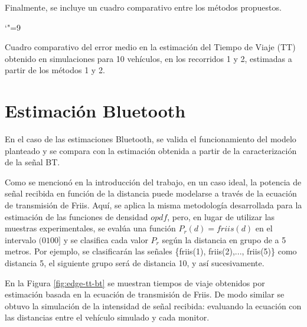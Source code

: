 Finalmente, se incluye un cuadro comparativo entre los métodos propuestos.

\begin{table}[!htp]
\centering
\begingroup\catcode`"=9
 \captionsetup{width=0.8\textwidth}
    \caption{Cuadro comparativo del error medio en la estimación del Tiempo de Viaje (TT) obtenido en simulaciones para 10 vehículos, en los recorridos 1 y 2, estimadas a partir de los métodos 1 y 2.}
    \label{tbl:method-compare}
\endgroup
\end{table}


\section{Estimación Bluetooth}

En el caso de las estimaciones Bluetooth, se valida el funcionamiento del modelo planteado y se compara con la estimación obtenida a partir de la caracterización de la señal BT.

Como se mencionó en la introducción del trabajo, en un caso ideal, la potencia de señal recibida en función de la distancia puede modelarse a través de la ecuación de transmisión de Friis. Aquí, se aplica la misma metodología desarrollada para la estimación de las funciones de densidad $opdf$, pero, en lugar de utilizar las muestras experimentales, se evalúa una función $P_r(d) = friis(d)$ en el intervalo $(0 100]$ y se clasifica cada valor $P_r$ según la distancia en grupo de a 5 metros. Por ejemplo, se clasificarán las señales \{friis(1), friis(2),..., friis(5)\} como distancia 5, el siguiente grupo será de distancia 10, y así sucesivamente.

En la Figura \ref{fig:edge-tt-bt} se muestran tiempos de viaje obtenidos por estimación basada en la ecuación de transmisión de Friis. De modo similar se obtuvo la simulación de la intensidad de señal recibida: evaluando  la ecuación con las distancias entre el vehículo simulado y cada monitor.

